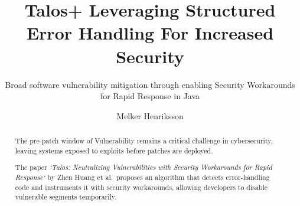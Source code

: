 \documentclass[a4paper,11pt]{report}
\title{Talos+ Leveraging Structured Error Handling For Increased Security}
\subtitle{Broad software vulnerability mitigation through enabling Security Workarounds for Rapid Response in Java}
\author{Melker Henriksson}
\begin{document}
\maketitle

\cleardoublepage\begin{abstract}


The pre-patch window of Vulnerability remains a critical challenge in cybersecurity, leaving systems exposed to exploits before patches are deployed.

The paper \textit{`Talos: Neutralizing Vulnerabilities with Security Workarounds for Rapid Response`} by Zhen Huang et al.~proposes an algorithm that detects error-handling code and instruments it with security workarounds, allowing developers to disable vulnerable segments temporarily. 


\end{abstract}
\end{document}

